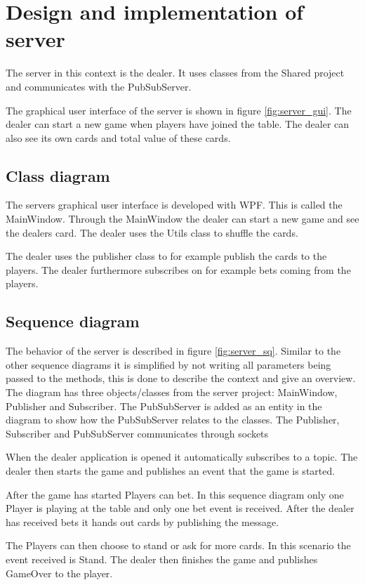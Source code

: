 \FloatBarrier

\section{Design and implementation of server}
The server in this context is the dealer. It uses classes from the Shared project and communicates with the PubSubServer.

The graphical user interface of the server is shown in figure \ref{fig:server_gui}. The dealer can start a new game when players have joined the table. The dealer can also see its own cards and total value of these cards.  

\FloatBarrier

\subsection{Class diagram}
The servers graphical user interface is developed with WPF. This is called the MainWindow. Through the MainWindow the dealer can start a new game and see the dealers card. The dealer uses the Utils class to shuffle the cards. 

The dealer uses the publisher class to for example publish the cards to the players. The dealer furthermore subscribes on for example bets coming from the players.

\FloatBarrier

\subsection{Sequence diagram}
The behavior of the server is described in figure \ref{fig:server_sq}. Similar to the other sequence diagrams it is simplified by not writing all parameters being passed to the methods, this is done to describe the context and give an overview. The diagram has three objects/classes from the server project: MainWindow, Publisher and Subscriber. The PubSubServer is added as an entity in the diagram to show how the PubSubServer relates to the classes. The Publisher, Subscriber and PubSubServer communicates through sockets

When the dealer application is opened it automatically subscribes to a topic. The dealer then starts the game and publishes an event that the game is started.

After the game has started Players can bet. In this sequence diagram only one Player is playing at the table and only one bet event is received. After the dealer has received bets it hands out cards by publishing the message. 

The Players can then choose to stand or ask for more cards. In this scenario the event received is Stand. The dealer then finishes the game and publishes GameOver to the player.

\FloatBarrier
